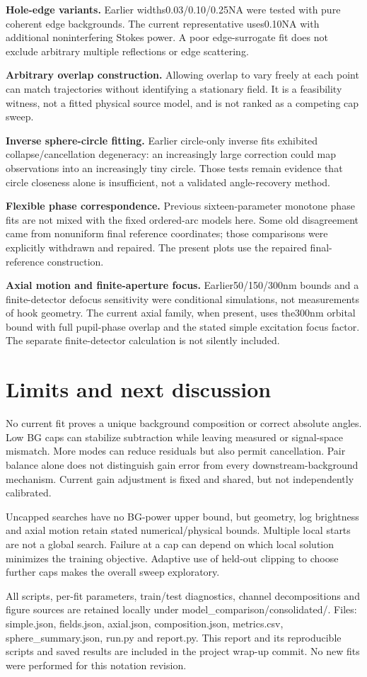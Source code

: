 \documentclass[10pt,a4paper]{article}
\begin{document}
\textbf{Hole-edge variants.} Earlier widths0.03/0.10/0.25NA were tested with pure coherent edge backgrounds. The current representative uses0.10NA with additional noninterfering Stokes power. A poor edge-surrogate fit does not exclude arbitrary multiple reflections or edge scattering.

\textbf{Arbitrary overlap construction.} Allowing overlap to vary freely at each point can match trajectories without identifying a stationary field. It is a feasibility witness, not a fitted physical source model, and is not ranked as a competing cap sweep.

\textbf{Inverse sphere-circle fitting.} Earlier circle-only inverse fits exhibited collapse/cancellation degeneracy: an increasingly large correction could map observations into an increasingly tiny circle. Those tests remain evidence that circle closeness alone is insufficient, not a validated angle-recovery method.

\textbf{Flexible phase correspondence.} Previous sixteen-parameter monotone phase fits are not mixed with the fixed ordered-arc models here. Some old disagreement came from nonuniform final reference coordinates; those comparisons were explicitly withdrawn and repaired. The present plots use the repaired final-reference construction.

\textbf{Axial motion and finite-aperture focus.} Earlier50/150/300nm bounds and a finite-detector defocus sensitivity were conditional simulations, not measurements of hook geometry. The current axial family, when present, uses the300nm orbital bound with full pupil-phase overlap and the stated simple excitation focus factor. The separate finite-detector calculation is not silently included.

\section{Limits and next discussion}
No current fit proves a unique background composition or correct absolute angles. Low BG caps can stabilize subtraction while leaving measured or signal-space mismatch. More modes can reduce residuals but also permit cancellation. Pair balance alone does not distinguish gain error from every downstream-background mechanism. Current gain adjustment is fixed and shared, but not independently calibrated.

Uncapped searches have no BG-power upper bound, but geometry, log brightness and axial motion retain stated numerical/physical bounds. Multiple local starts are not a global search. Failure at a cap can depend on which local solution minimizes the training objective. Adaptive use of held-out clipping to choose further caps makes the overall sweep exploratory.

All scripts, per-fit parameters, train/test diagnostics, channel decompositions and figure sources are retained locally under model\_comparison/consolidated/. Files: simple.json, fields.json, axial.json, composition.json, metrics.csv, sphere\_summary.json, run.py and report.py. This report and its reproducible scripts and saved results are included in the project wrap-up commit. No new fits were performed for this notation revision.
\end{document}
